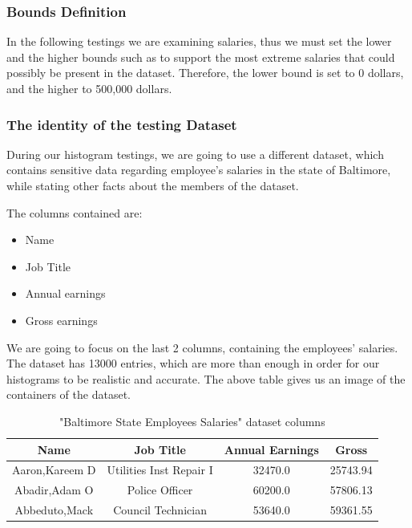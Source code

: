 \subsubsection{Bounds Definition}

In the following testings we are examining salaries, thus we must set the lower and the higher bounds such as to support the most extreme salaries that could possibly be present in the dataset. Therefore, the lower bound is set to 0 dollars, and the higher to 500,000 dollars.

\subsubsection{The identity of the testing Dataset}

During our histogram testings, we are going to use a different dataset, which contains  sensitive data regarding employee's salaries in the state of Baltimore, while stating other facts about the members of the dataset. 

The columns contained are: 
\begin{itemize}
    \item Name
    \item Job Title
    \item Annual earnings
    \item Gross earnings
\end{itemize}

We are going to focus on the last 2 columns, containing the employees' salaries. The dataset has 13000 entries, which are more than enough in order for our histograms to be realistic and accurate. The above table gives us an image of the containers of the dataset.

\begin{table}[!htb]
    \centering

    \caption{"Baltimore State Employees Salaries" dataset columns}
    \label{numbers}

    \begin{tabular}{| c | c | c | c |}
      \hline 
      Name & Job Title & Annual Earnings & Gross \\
      \hline
      Aaron,Kareem D & Utilities Inst Repair I	 & 32470.0 & 25743.94 \\
      \hline
      Abadir,Adam O	 & Police Officer &  60200.0 & 57806.13  \\
      \hline
      Abbeduto,Mack & Council Technician & 53640.0 &  59361.55 \\
      \hline
    \end{tabular}
\end{table}

